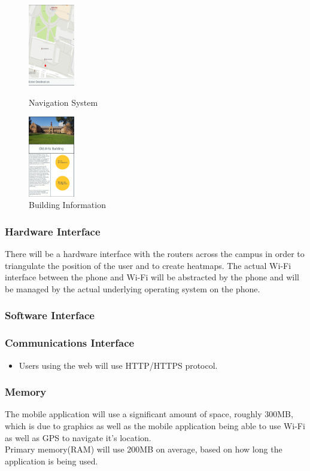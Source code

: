 \documentclass{article}
\begin{document}
\begin{figure}[h]
\centering
\begin{minipage}{.5\textwidth}
	\centering
	\includegraphics[width=2cm]{Navigation}
	\caption{Navigation System}
\end{minipage}%
\begin{minipage}{.5\textwidth}
	\centering
	\includegraphics[width=2cm]{BuildingInfo}
	\caption{Building Information}
\end{minipage}%
\end{figure}


            \subsubsection{Hardware Interface}
		{There will be a hardware interface with the routers across the campus in order to triangulate the position of the user and to create heatmaps. The actual Wi-Fi interface between the phone and Wi-Fi will be abstracted by the phone and will be managed by the actual underlying operating system on the phone.}
            \subsubsection{Software Interface}
            
            \subsubsection{Communications Interface} \begin{itemize}
	    \item Users using the web will use HTTP/HTTPS protocol.
	    \end{itemize}
            \subsubsection{Memory}
	    {The mobile application will use a significant amount of space, roughly 300MB, which is due to graphics as well as the mobile application being able to use Wi-Fi as well as GPS to navigate it's location.\\
Primary memory(RAM) will use 200MB on average, based on how long the application is being used.}
\end{document}
